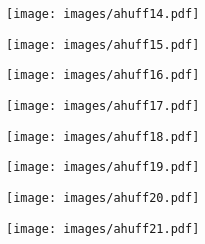 \begin{frame}[allowframebreaks]
\begin{example}
  \examplebreak
                \begin{figure}[h!]
                \centering
                \texttt{[image: images/ahuff14.pdf]}
                \label{fig:ahuff14}
                \end{figure}

  \examplebreak
                \begin{figure}[h!]
                \centering
                \texttt{[image: images/ahuff15.pdf]}
                \label{fig:ahuff15}
                \end{figure}

  \examplebreak
                \begin{figure}[h!]
                \centering
                \texttt{[image: images/ahuff16.pdf]}
                \label{fig:ahuff16}
                \end{figure}

  \examplebreak
                \begin{figure}[h!]
                \centering
                \texttt{[image: images/ahuff17.pdf]}
                \label{fig:ahuff17}
                \end{figure}

  \examplebreak
                \begin{figure}[h!]
                \centering
                \texttt{[image: images/ahuff18.pdf]}
                \label{fig:ahuff18}
                \end{figure}

  \examplebreak
                \begin{figure}[h!]
                \centering
                \texttt{[image: images/ahuff19.pdf]}
                \label{fig:ahuff19}
                \end{figure}

  \examplebreak
                \begin{figure}[h!]
                \centering
                \texttt{[image: images/ahuff20.pdf]}
                \label{fig:ahuff20}
                \end{figure}

  \examplebreak
                \begin{figure}[h!]
                \centering
                \texttt{[image: images/ahuff21.pdf]}
                \label{fig:ahuff21}
                \end{figure}


\end{example}
\end{frame}
